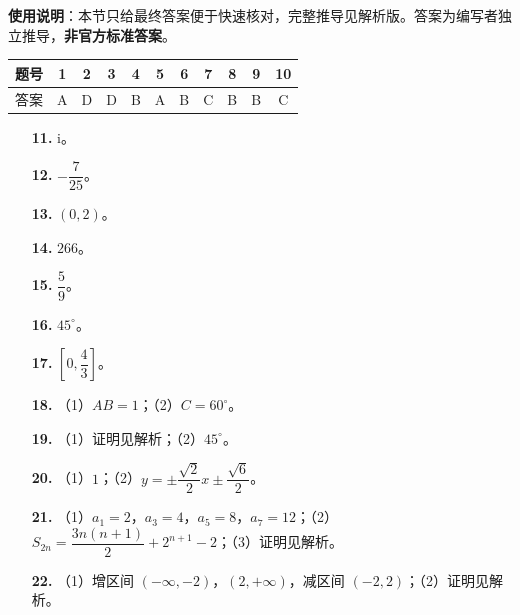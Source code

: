 
\begin{gknotice}
\textbf{使用说明}：本节只给最终答案便于快速核对，完整推导见解析版。答案为编写者独立推导，\textbf{非官方标准答案}。
\end{gknotice}

\begin{center}\begin{tabular}{ccccccccccc}
\toprule
题号 & 1 & 2 & 3 & 4 & 5 & 6 & 7 & 8 & 9 & 10 \\
\midrule
答案 & A & D & D & B & A & B & C & B & B & C \\
\bottomrule
\end{tabular}\end{center}

\begin{itemize}[leftmargin=2.6em]
  \item[\textbf{11.}] $\mathrm i$。
  \item[\textbf{12.}] $-\dfrac7{25}$。
  \item[\textbf{13.}] $(0,2)$。
  \item[\textbf{14.}] $266$。
  \item[\textbf{15.}] $\dfrac59$。
  \item[\textbf{16.}] $45^\circ$。
  \item[\textbf{17.}] $\left[0,\dfrac43\right]$。
\end{itemize}

\begin{itemize}[leftmargin=2.6em]
  \item[\textbf{18.}] （1）$AB=1$；（2）$C=60^\circ$。
  \item[\textbf{19.}] （1）证明见解析；（2）$45^\circ$。
  \item[\textbf{20.}] （1）$1$；（2）$y=\pm\dfrac{\sqrt2}{2}x\pm\dfrac{\sqrt6}{2}$。
  \item[\textbf{21.}] （1）$a_1=2$，$a_3=4$，$a_5=8$，$a_7=12$；（2）$S_{2n}=\dfrac{3n(n+1)}2+2^{n+1}-2$；（3）证明见解析。
  \item[\textbf{22.}] （1）增区间 $(-\infty,-2)$，$(2,+\infty)$，减区间 $(-2,2)$；（2）证明见解析。
\end{itemize}
